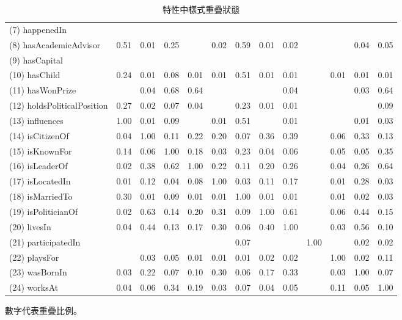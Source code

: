 \begin{table}[t]
\begin{center}
\begin{tabular}{l||*{12}{c}}
            (7) happenedIn  &    &    &    &    &    &    &    &    &    &    &    &   \\
            (8) hasAcademicAdvisor  & 0.51  & 0.01  & 0.25  &    & 0.02  & 0.59  & 0.01  & 0.02  &    &    & 0.04  & 0.05 \\
            (9) hasCapital  &    &    &    &    &    &    &    &    &    &    &    &   \\
            (10) hasChild  & 0.24  & 0.01  & 0.08  & 0.01  & 0.01  & 0.51  & 0.01  & 0.01  &    & 0.01  & 0.01  & 0.01 \\
            (11) hasWonPrize  &    & 0.04  & 0.68  & 0.64  &    &    &    & 0.04  &    &    & 0.03  & 0.64 \\
            (12) holdsPoliticalPosition  & 0.27  & 0.02  & 0.07  & 0.04  &    & 0.23  & 0.01  & 0.01  &    &    &    & 0.09 \\
            (13) influences  & 1.00  & 0.01  & 0.09  &    & 0.01  & 0.51  &    & 0.01  &    &    & 0.01  & 0.03 \\
            (14) isCitizenOf  & 0.04  & 1.00  & 0.11  & 0.22  & 0.20  & 0.07  & 0.36  & 0.39  &    & 0.06  & 0.33  & 0.13 \\
            (15) isKnownFor  & 0.14  & 0.06  & 1.00  & 0.18  & 0.03  & 0.23  & 0.04  & 0.06  &    & 0.05  & 0.05  & 0.35 \\
            (16) isLeaderOf  & 0.02  & 0.38  & 0.62  & 1.00  & 0.22  & 0.11  & 0.20  & 0.26  &    & 0.04  & 0.26  & 0.64 \\
            (17) isLocatedIn  & 0.01  & 0.12  & 0.04  & 0.08  & 1.00  & 0.03  & 0.11  & 0.17  &    & 0.01  & 0.28  & 0.03 \\
            (18) isMarriedTo  & 0.30  & 0.01  & 0.09  & 0.01  & 0.01  & 1.00  & 0.01  & 0.01  &    & 0.01  & 0.02  & 0.03 \\
            (19) isPoliticianOf  & 0.02  & 0.63  & 0.14  & 0.20  & 0.31  & 0.09  & 1.00  & 0.61  &    & 0.06  & 0.44  & 0.15 \\
            (20) livesIn  & 0.04  & 0.44  & 0.13  & 0.17  & 0.30  & 0.06  & 0.40  & 1.00  &    & 0.03  & 0.56  & 0.10 \\
            (21) participatedIn  &    &    &    &    &    & 0.07  &    &    & 1.00  &    & 0.02  & 0.02 \\
            (22) playsFor  &    & 0.03  & 0.05  & 0.01  & 0.01  & 0.01  & 0.02  & 0.02  &    & 1.00  & 0.02  & 0.11 \\
            (23) wasBornIn  & 0.03  & 0.22  & 0.07  & 0.10  & 0.30  & 0.06  & 0.17  & 0.33  &    & 0.03  & 1.00  & 0.07 \\
            (24) worksAt  & 0.04  & 0.06  & 0.34  & 0.19  & 0.03  & 0.07  & 0.04  & 0.05  &    & 0.11  & 0.05  & 1.00 \\
        \end{tabular}
        \caption{特性中樣式重疊狀態}
        \normalsize
        數字代表重疊比例。
        \label{t:yago-overlap}
    \end{center}
\end{table}
